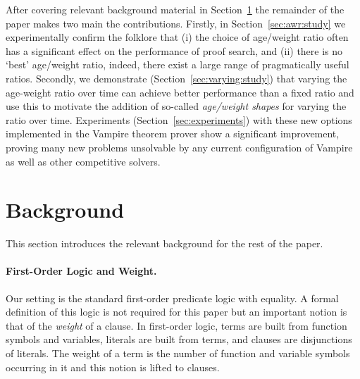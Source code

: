 \documentclass{llncs}
\begin{document}
After covering relevant background material in Section~\ref{sec:background} the remainder of the paper makes two main the contributions. Firstly, in Section~\ref{sec:awr:study} we experimentally confirm the folklore that (i) the choice of age/weight ratio often has a significant effect on the performance of proof search, and (ii) there is no `best' age/weight ratio, indeed, there exist a large range of pragmatically useful ratios. Secondly, we demonstrate (Section~\ref{sec:varying:study}) that varying the age-weight ratio over time can achieve better performance than a fixed ratio and use this to motivate the addition of so-called \emph{age/weight shapes} for varying the ratio over time. 
Experiments (Section~\ref{sec:experiments}) with these new options implemented in the Vampire theorem prover show a significant improvement, proving many new problems unsolvable by any current configuration of Vampire as well as other competitive solvers.


\section{Background} \label{sec:background}

This section introduces the relevant background for the rest of the paper.



\paragraph{First-Order Logic and Weight.} Our setting is the standard first-order predicate logic with equality. A formal definition of this logic is not required for this paper but an important notion is that of the \emph{weight} of a clause. In first-order logic,  terms are built from function symbols and variables, literals are built from terms, and clauses are disjunctions of literals. The weight of a term is the number of function and variable symbols occurring in it and this notion is lifted to clauses. 
\end{document}
